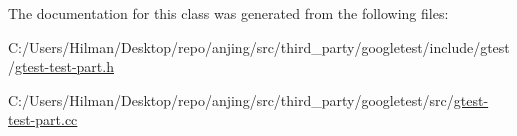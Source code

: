 The documentation for this class was generated from the following files\+:\begin{DoxyCompactItemize}
\item 
C\+:/\+Users/\+Hilman/\+Desktop/repo/anjing/src/third\+\_\+party/googletest/include/gtest/\hyperlink{gtest-test-part_8h}{gtest-\/test-\/part.\+h}\item 
C\+:/\+Users/\+Hilman/\+Desktop/repo/anjing/src/third\+\_\+party/googletest/src/\hyperlink{gtest-test-part_8cc}{gtest-\/test-\/part.\+cc}\end{DoxyCompactItemize}
